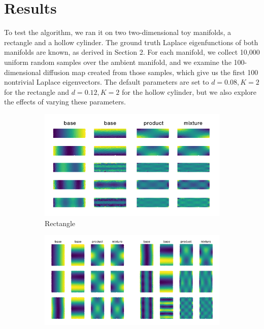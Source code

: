 \documentclass{article}
\numberwithin{equation}{section}
\theoremstyle{definition}
\begin{document}
\section{Results}
To test the algorithm, we ran it on two two-dimensional toy manifolds, a rectangle and a hollow cylinder. The ground truth Laplace eigenfunctions of both manifolds are known, as derived in Section 2. For each manifold, we collect 10,000 uniform random samples over the ambient manifold, and we examine the 100-dimensional diffusion map created from those samples, which give us the first 100 nontrivial Laplace eigenvectors. The default parameters are set to $d=0.08, K=2$ for the rectangle and $d=0.12, K=2$ for the hollow cylinder, but we also explore the effects of varying these parameters.

\begin{figure} 
    \centering
    \begin{subfigure}[t]{\textwidth}
        \centering
        \includegraphics[width=\textwidth]{images/line_line_matches.png}
        \caption{Rectangle}
    \end{subfigure}
    \begin{subfigure}[t]{\textwidth}
        \centering
        \includegraphics[width=\textwidth]{images/line_circle_matches.png}

\end{subfigure}
\end{figure}
\end{document}
